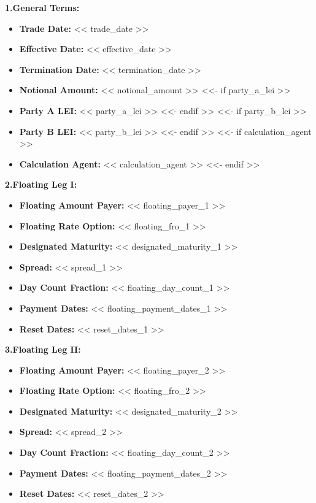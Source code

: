 \documentclass[11pt, a4paper]{article}
\begin{document}
\vspace{0.3cm}
\noindent \textbf{1.\quad General Terms:}
\begin{itemize}[leftmargin=2cm, label={}, itemsep=3pt]
    \item \textbf{Trade Date:} << trade_date >>
    \item \textbf{Effective Date:} << effective_date >>
    \item \textbf{Termination Date:} << termination_date >>
    \item \textbf{Notional Amount:} << notional_amount >>
<<- if party_a_lei >>
    \item \textbf{Party A LEI:} << party_a_lei >>
<<- endif >>
<<- if party_b_lei >>
    \item \textbf{Party B LEI:} << party_b_lei >>
<<- endif >>
<<- if calculation_agent >>
    \item \textbf{Calculation Agent:} << calculation_agent >>
<<- endif >>
\end{itemize}

\vspace{0.3cm}
\noindent \textbf{2.\quad Floating Leg I:}
\begin{itemize}[leftmargin=2cm, label={}, itemsep=3pt]
    \item \textbf{Floating Amount Payer:} << floating_payer_1 >>
    \item \textbf{Floating Rate Option:} << floating_fro_1 >>
    \item \textbf{Designated Maturity:} << designated_maturity_1 >>
    \item \textbf{Spread:} << spread_1 >>
    \item \textbf{Day Count Fraction:} << floating_day_count_1 >>
    \item \textbf{Payment Dates:} << floating_payment_dates_1 >>
    \item \textbf{Reset Dates:} << reset_dates_1 >>
\end{itemize}

\vspace{0.3cm}
\noindent \textbf{3.\quad Floating Leg II:}
\begin{itemize}[leftmargin=2cm, label={}, itemsep=3pt]
    \item \textbf{Floating Amount Payer:} << floating_payer_2 >>
    \item \textbf{Floating Rate Option:} << floating_fro_2 >>
    \item \textbf{Designated Maturity:} << designated_maturity_2 >>
    \item \textbf{Spread:} << spread_2 >>
    \item \textbf{Day Count Fraction:} << floating_day_count_2 >>
    \item \textbf{Payment Dates:} << floating_payment_dates_2 >>
    \item \textbf{Reset Dates:} << reset_dates_2 >>
\end{itemize}
\end{document}
